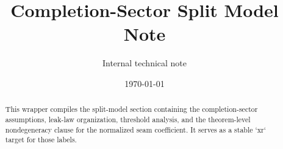 \documentclass[11pt]{article}
\title{Completion-Sector Split Model Note}
\author{Internal technical note}
\date{\today}
\theoremstyle{definition}
\theoremstyle{plain}
\theoremstyle{remark}
\begin{document}
\maketitle

\begin{abstract}
This wrapper compiles the split-model section containing the completion-sector assumptions,
leak-law organization, threshold analysis, and the theorem-level nondegeneracy clause for the
normalized seam coefficient.
It serves as a stable `xr` target for those labels.
\end{abstract}

\tableofcontents

\end{document}
